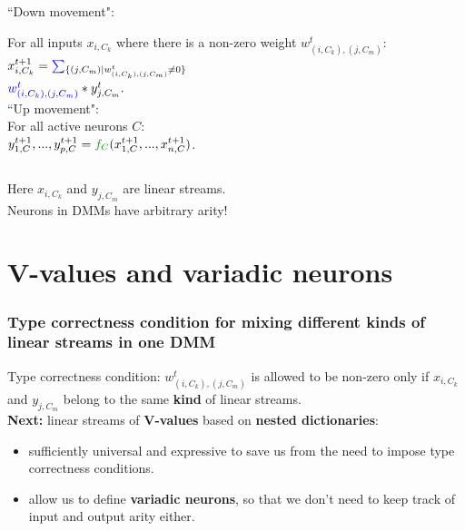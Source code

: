 \documentclass{beamer}
\newcommand{\msblue}[1]{{\color{myblue} #1}}
\newcommand{\msmagenta}[1]{{\color{mymagenta} #1}}
\newcommand{\msgreen}[1]{{\color{mygreen} #1}}
\begin{document}
\begin{frame}
\begin{columns}[T]
\begin{column}{0.3\textwidth}
{%
\tiny
``Down movement": 

\msblue{For all inputs $x_{i,C_k}$ where there is a non-zero weight $w_{(i,C_k), (j,C_m)}^t$:}\\[1ex]

{\scriptsize$x_{i,C_k}^{t+1} = \msblue{\sum}_{\{(j,C_m) | w_{(i,C_k), (j,C_m)}^t \neq 0\}}$\\[0.1ex]$\msblue{w_{(i,C_k), (j,C_m)}^t }* y_{j, C_m}^{t}.$}\\[3ex]

``Up movement":\\[0.1ex]  

\msgreen{For all active neurons $C$:}\\[1ex]

{\scriptsize $y^{t+1}_{1,C},...,y^{t+1}_{p,C} = \msgreen{f_C} (x^{t+1}_{1,C},...,x^{t+1}_{n,C})$.}
}

\end{column}
\end{columns}


Here $x_{i,C_k}$ and $y_{j,C_m}$ are linear streams.\\
\msmagenta{Neurons in DMMs have arbitrary arity!}

\end{frame}







\section{V-values and variadic neurons}







\begin{frame}

  \frametitle{Type correctness condition  for mixing different kinds of linear streams in one DMM}


\msmagenta{Type correctness condition:} $w_{(i,C_k), (j,C_m)}^t$ is allowed to be
non-zero only if $x_{i,C_k}$ and $y_{j, C_m}$ belong to the same {\bf kind} of linear streams.\\[6ex]

{\bf Next:} \msmagenta{linear streams of {\bf V-values} based on {\bf nested dictionaries}:}\\[2ex]

\begin{itemize}

\item sufficiently universal and expressive to save us from the need to impose type correctness conditions.\\[2ex]

\item allow us to define {\bf variadic neurons}, so that we don't need to keep track of input and output
arity either.
\end{itemize}

\end{frame}
\end{document}
